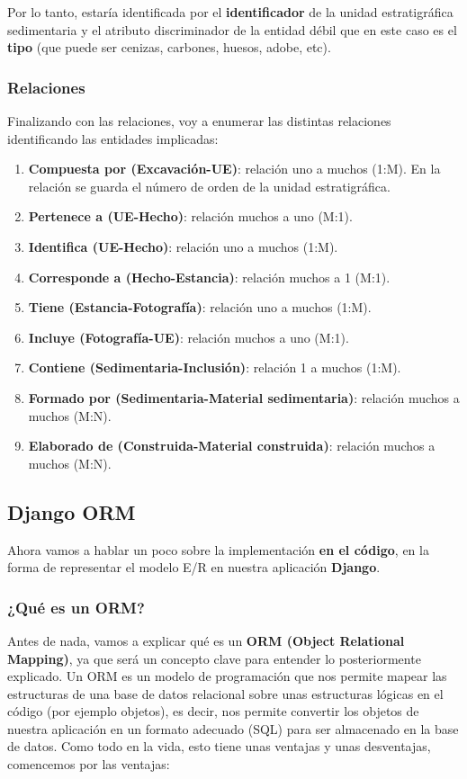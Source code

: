    Por lo tanto, estaría identificada por el \textbf{identificador} de la unidad estratigráfica
    sedimentaria y el atributo discriminador de la entidad débil que en este caso es el
    \textbf{tipo} (que puede ser cenizas, carbones, huesos, adobe, etc).

    \subsubsection{Relaciones}
    Finalizando con las relaciones, voy a enumerar las distintas relaciones identificando las
    entidades implicadas:

        \begin{enumerate}
            \item \textbf{Compuesta por (Excavación-UE)}: relación uno a muchos (1:M). En la
            relación se guarda el número de orden de la unidad estratigráfica.
            \item \textbf{Pertenece a (UE-Hecho)}: relación muchos a uno (M:1).
            \item \textbf{Identifica (UE-Hecho)}: relación uno a muchos (1:M).
            \item \textbf{Corresponde a (Hecho-Estancia)}: relación muchos a 1 (M:1).
            \item \textbf{Tiene (Estancia-Fotografía)}: relación uno a muchos (1:M).
            \item \textbf{Incluye (Fotografía-UE)}: relación muchos a uno (M:1).
            \item \textbf{Contiene (Sedimentaria-Inclusión)}: relación 1 a muchos (1:M).
            \item \textbf{Formado por (Sedimentaria-Material sedimentaria)}: relación muchos a
            muchos (M:N).
            \item \textbf{Elaborado de (Construida-Material construida)}: relación muchos a
            muchos (M:N).
        \end{enumerate}

    \subsection{Django ORM}
    Ahora vamos a hablar un poco sobre la implementación \textbf{en el código}, en la forma
    de representar el modelo E/R en nuestra aplicación \textbf{Django}.\\

    \subsubsection{¿Qué es un ORM?}
    Antes de nada, vamos a explicar qué es un \textbf{ORM (Object Relational Mapping)}, ya
    que será un concepto clave para entender lo posteriormente explicado. Un ORM es un modelo
    de programación que nos permite mapear las estructuras de una base de datos relacional
    sobre unas estructuras lógicas en el código (por ejemplo objetos), es decir, nos permite
    convertir los objetos de nuestra aplicación en un formato adecuado (SQL) para ser
    almacenado en la base de datos. Como todo en la vida, esto tiene unas ventajas y unas
    desventajas, comencemos por las ventajas:

